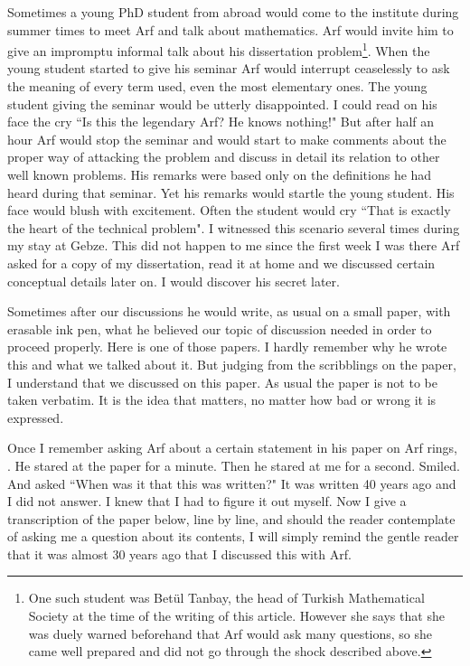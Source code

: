 \documentclass[12pt]{amsart}
\begin{document}
Sometimes a young PhD student from abroad would come to the institute during summer times to meet Arf and talk about mathematics. Arf would invite him to give an impromptu informal talk about his  dissertation problem\footnote{One such student was Bet\"{u}l Tanbay, the head of Turkish Mathematical Society at the time of the writing of this article. However she says that she was duely warned beforehand that Arf would ask many questions, so she came well prepared and did not go through the shock described above.}. When the young student started to give his seminar Arf would interrupt ceaselessly to ask the meaning of every term used, even the most elementary ones. The young student giving the seminar would be utterly disappointed. I could read on his face the cry ``Is this the legendary Arf? He knows nothing!"  But after half an hour Arf would stop the seminar and would start to make comments about the proper way of attacking the problem  and discuss in detail its relation to other well known problems. His remarks were based only on the definitions he had heard during that seminar. Yet his remarks would startle the young student. His  face would blush with excitement. Often the student would cry ``That is exactly the heart of the technical problem". I witnessed this scenario several times during my stay at Gebze. This did not happen to me since the first week I was there Arf asked for a copy of my dissertation, read it at home and we discussed certain conceptual details later on. I would discover his secret later.

Sometimes after our discussions he would write, as usual on a small paper, with erasable ink pen, what he believed our topic of discussion needed in order to proceed properly. Here is one of those papers. I hardly remember why he wrote this and what we talked about it.  But judging from the scribblings  on the paper, I understand that we discussed on this paper. As usual the paper is not to be taken verbatim. It is the idea that matters, no matter how bad or wrong it is expressed.

Once I remember asking Arf about a certain statement in his paper on Arf rings, \cite{carf8}. He stared at the paper for a minute. Then he stared at me for a second. Smiled. And asked ``When was it that this was written?" It was written 40 years ago and I did not answer. I knew that I had to figure it out myself. Now I give a transcription of the paper below, line by line, and should the reader contemplate of asking me a question about its contents, I will simply remind the gentle reader that it was almost 30 years ago that I discussed this with Arf.
\end{document}
